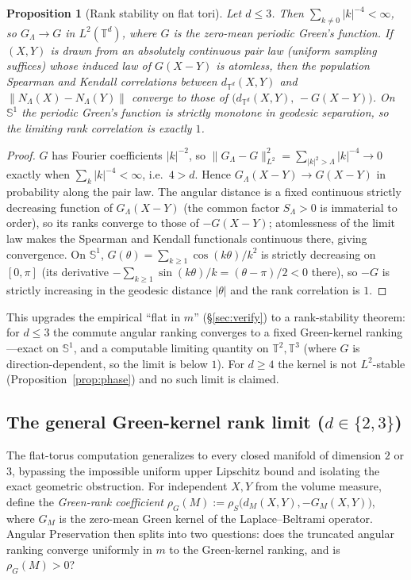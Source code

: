 \documentclass[11pt]{article}
\newtheorem{proposition}[theorem]{Proposition}
\theoremstyle{remark}
\begin{document}
\begin{proposition}[Rank stability on flat tori]\label{prop:rank-torus}
Let $d\le3$. Then $\sum_{k\ne0}\lvert k\rvert^{-4}<\infty$, so $G_\Lambda\to G$ in
$L^2(\mathbb T^d)$, where $G$ is the zero-mean periodic Green's function. If $(X,Y)$ is
drawn from an absolutely continuous pair law (uniform sampling suffices) whose induced law of $G(X-Y)$ is atomless, then the population
Spearman and Kendall correlations between $d_{\mathbb T^d}(X,Y)$ and
$\lVert N_\Lambda(X)-N_\Lambda(Y)\rVert$ converge to those of
$\bigl(d_{\mathbb T^d}(X,Y),\,-G(X-Y)\bigr)$. On $\mathbb S^1$ the periodic Green's
function is strictly monotone in geodesic separation, so the limiting rank correlation
is exactly $1$.
\end{proposition}

\begin{proof}
$G$ has Fourier coefficients $\lvert k\rvert^{-2}$, so
$\lVert G_\Lambda-G\rVert^2_{L^2}=\sum_{\lvert k\rvert^2>\Lambda}\lvert k\rvert^{-4}\to0$
exactly when $\sum_k\lvert k\rvert^{-4}<\infty$, i.e.\ $4>d$. Hence $G_\Lambda(X-Y)\to
G(X-Y)$ in probability along the pair law. The angular distance is a fixed continuous
strictly decreasing function of $G_\Lambda(X-Y)$ (the common factor $S_\Lambda>0$ is
immaterial to order), so its ranks converge to those of $-G(X-Y)$; atomlessness of the
limit law makes the Spearman and Kendall functionals continuous there, giving
convergence. On $\mathbb S^1$, $G(\theta)=\sum_{k\ge1}\cos(k\theta)/k^2$ is strictly
decreasing on $[0,\pi]$ (its derivative $-\sum_{k\ge1}\sin(k\theta)/k=(\theta-\pi)/2<0$
there), so $-G$ is strictly increasing in the geodesic distance $\lvert\theta\rvert$
and the rank correlation is $1$.
\end{proof}

\noindent This upgrades the empirical ``flat in $m$'' (\S\ref{sec:verify}) to a
rank-stability theorem: for $d\le3$ the commute angular ranking converges to a fixed
Green-kernel ranking---exact on $\mathbb S^1$, and a computable limiting quantity on
$\mathbb T^2,\mathbb T^3$ (where $G$ is direction-dependent, so the limit is below $1$).
For $d\ge4$ the kernel is not $L^2$-stable (Proposition~\ref{prop:phase}) and no such
limit is claimed.


\subsection*{The general Green-kernel rank limit ($d\in\{2,3\}$)}
The flat-torus computation generalizes to every closed manifold of dimension $2$ or
$3$, bypassing the impossible uniform upper Lipschitz bound and isolating the exact
geometric obstruction. For independent $X,Y$ from the volume measure, define the
\emph{Green-rank coefficient} $\rho_G(M):=\rho_S\bigl(d_M(X,Y),-G_M(X,Y)\bigr)$, where
$G_M$ is the zero-mean Green kernel of the Laplace--Beltrami operator. Angular
Preservation then splits into two questions: does the truncated angular ranking
converge uniformly in $m$ to the Green-kernel ranking, and is $\rho_G(M)>0$?
\end{document}

